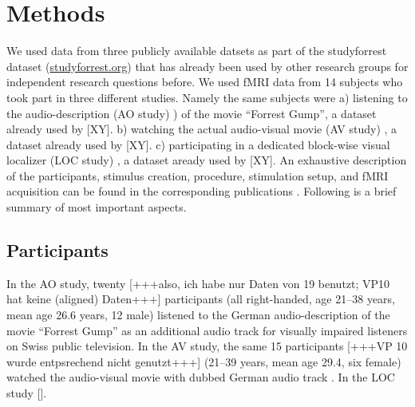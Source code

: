 \documentclass[english]{article}
\begin{document}
\section{Methods}
We used data from three publicly available datsets as part of the studyforrest dataset (\href{http://www.studyforrest.org}{studyforrest.org}) that has already been used by other research groups for independent research questions before. We used fMRI data from 14 subjects who took part in three different studies. Namely the same subjects were
a) listening to the audio-description (AO study) \citep{hanke2014audiomovie}) of the movie ``Forrest Gump'', a dataset already used by [XY].
b) watching the actual audio-visual movie (AV study) \citep{hanke2016simultaneous}, a dataset already used by [XY].
c) participating in a dedicated block-wise visual localizer (LOC study) \citep{sengupta2016extension}, a dataset aready used by [XY]. An exhaustive description of the participants, stimulus creation, procedure, stimulation setup, and fMRI acquisition can be found in the corresponding publications  \citep{hanke2014audiomovie, hanke2016simultaneous, sengupta2016extension}. Following is a brief summary of most important aspects.


\subsection{Participants}
In the AO study, twenty [+++also, ich habe nur Daten von 19 benutzt; VP10 hat keine (aligned) Daten+++] participants (all right-handed, age 21–38 years, mean age 26.6 years, 12 male) listened to the German audio-description \citep{ForrestGumpGermanAD} of the movie ``Forrest Gump'' \citep{ForrestGumpMovie} as an additional audio track for visually impaired listeners on Swiss public television.
In the AV study, the same 15 participants [+++VP 10 wurde entpsrechend nicht genutzt+++] (21–39 years, mean age 29.4, six female) watched the audio-visual movie with dubbed German audio track \citep{ForrestGumpDVD}.
In the LOC study [].
\end{document}
